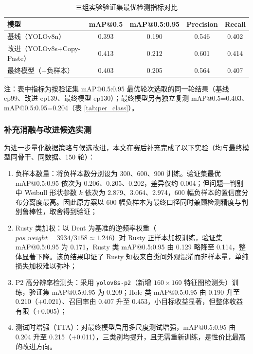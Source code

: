 \begin{table}[H]
\centering
{}
\caption{三组实验验证集最优检测指标对比}\label{tab:det_compare}
\begin{tabular}{lcccc}
  \toprule
  模型 & mAP@0.5 & mAP@0.5:0.95 & Precision & Recall \\
  \midrule
  基线（YOLOv8n） & 0.393 & 0.190 & 0.546 & 0.402 \\
  改进（YOLOv8s+Copy-Paste） & 0.413 & 0.212 & 0.601 & 0.414 \\
  最终模型（+负样本） & 0.403 & 0.205 & 0.564 & 0.407 \\
  \bottomrule
\end{tabular}
  \vspace{2pt}
  {\footnotesize 注：表中指标为按验证集 mAP@0.5:0.95 最优轮次选取的同一轮结果（基线 ep99、改进 ep139、最终模型 ep130）；最终模型另有独立复测 mAP@0.5=0.403、mAP@0.5:0.95=0.204（表 \ref{tab:per_class}）。}
\end{table}

\subsubsection{补充消融与改进候选实测}

为进一步量化数据策略与候选改进，本文在赛后补充完成了以下实验（均与最终模型同骨干、同数据、150 轮）：

\begin{enumerate}[leftmargin=2.2em,itemsep=2pt]
  \item {\heiti 负样本数量：}将负样本数分别设为 300、600、900 训练。验证集最优 mAP@0.5:0.95 依次为 0.206、0.205、0.202，差异仅约 0.004；但问题一判别中 Weibull 形状参数 $k$ 依次为 2.879、3.064、2.974，600 幅负样本的置信度分布分离度最高。因此原方案以 600 幅负样本为最终口径同时兼顾检测精度与判别鲁棒性，取舍得到验证；
  \item {\heiti Rusty 类加权：}以 Dent 为基准的逆频率权重（$pos\_weight=3934/3158\approx1.246$）对 Rusty 正样本加权训练，验证集 mAP@0.5:0.95 为 0.171，Rusty 类 mAP@0.5:0.95 由 0.129 略降至 0.114，整体显著下降。该负结果印证了 Rusty 短板来自类间外观混淆而非样本量，单纯损失加权难以弥补；
  \item {\heiti P2 高分辨率检测头：}采用 \texttt{yolov8s-p2}（新增 $160\times160$ 特征图检测头）训练，验证集 mAP@0.5:0.95 为 0.209；Hole 类 mAP@0.5:0.95 由 0.190 升至 0.210（+0.021）、召回率由 0.407 升至 0.453，小目标收益显著，但整体收益有限（+0.005）；
  \item {\heiti 测试时增强（TTA）：}对最终模型启用多尺度测试增强，mAP@0.5:0.95 由 0.204 升至 0.215（+0.011），三类别均提升，且无需重新训练，是性价比最高的改进方向。
\end{enumerate}

